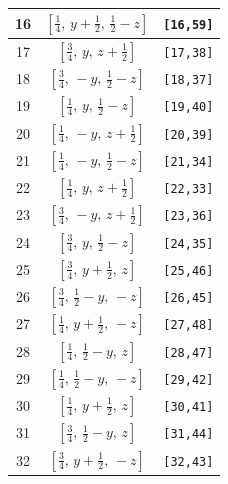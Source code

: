 \documentclass[fleqn,8pt]{jsarticle}
\begin{document}
\begin{longtable}{ccc}
16 & $\left[ \frac{1}{4},\, y + \frac{1}{2},\, \frac{1}{2} - z \right]$ & {\tt [16,59]} \\ \hline
17 & $\left[ \frac{3}{4},\, y,\, z + \frac{1}{2} \right]$ & {\tt [17,38]} \\ \hline
18 & $\left[ \frac{3}{4},\, - y,\, \frac{1}{2} - z \right]$ & {\tt [18,37]} \\ \hline
19 & $\left[ \frac{1}{4},\, y,\, \frac{1}{2} - z \right]$ & {\tt [19,40]} \\ \hline
20 & $\left[ \frac{1}{4},\, - y,\, z + \frac{1}{2} \right]$ & {\tt [20,39]} \\ \hline
21 & $\left[ \frac{1}{4},\, - y,\, \frac{1}{2} - z \right]$ & {\tt [21,34]} \\ \hline
22 & $\left[ \frac{1}{4},\, y,\, z + \frac{1}{2} \right]$ & {\tt [22,33]} \\ \hline
23 & $\left[ \frac{3}{4},\, - y,\, z + \frac{1}{2} \right]$ & {\tt [23,36]} \\ \hline
24 & $\left[ \frac{3}{4},\, y,\, \frac{1}{2} - z \right]$ & {\tt [24,35]} \\ \hline
25 & $\left[ \frac{3}{4},\, y + \frac{1}{2},\, z \right]$ & {\tt [25,46]} \\ \hline
26 & $\left[ \frac{3}{4},\, \frac{1}{2} - y,\, - z \right]$ & {\tt [26,45]} \\ \hline
27 & $\left[ \frac{1}{4},\, y + \frac{1}{2},\, - z \right]$ & {\tt [27,48]} \\ \hline
28 & $\left[ \frac{1}{4},\, \frac{1}{2} - y,\, z \right]$ & {\tt [28,47]} \\ \hline
29 & $\left[ \frac{1}{4},\, \frac{1}{2} - y,\, - z \right]$ & {\tt [29,42]} \\ \hline
30 & $\left[ \frac{1}{4},\, y + \frac{1}{2},\, z \right]$ & {\tt [30,41]} \\ \hline
31 & $\left[ \frac{3}{4},\, \frac{1}{2} - y,\, z \right]$ & {\tt [31,44]} \\ \hline
32 & $\left[ \frac{3}{4},\, y + \frac{1}{2},\, - z \right]$ & {\tt [32,43]} \\
\end{longtable}
\renewcommand{\arraystretch}{1.2}
\end{document}
